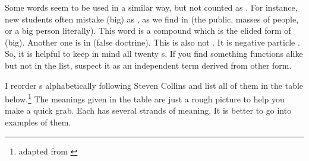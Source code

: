 Some words seem to be used in a similar way, but not counted as . For instance, new students often mistake  (big) as , as we find in  (the public, masses of people, or a big person literally). This word is a compound which  is the elided form of  (big). Another one is  in  (false doctrine). This is also not . It is negative particle . So, it is helpful to keep in mind all twenty s. If you find something functions alike but not in the list, suspect it as an independent term derived from other form.

I reorder s alphabetically following Steven Collins and list all of them in the table below.\footnote{adapted from \citealp[p.~125]{collins:grammar}} The meanings given in the table are just a rough picture to help you make a quick grab. Each  has several strands of meaning. It is better to go into examples of them.

